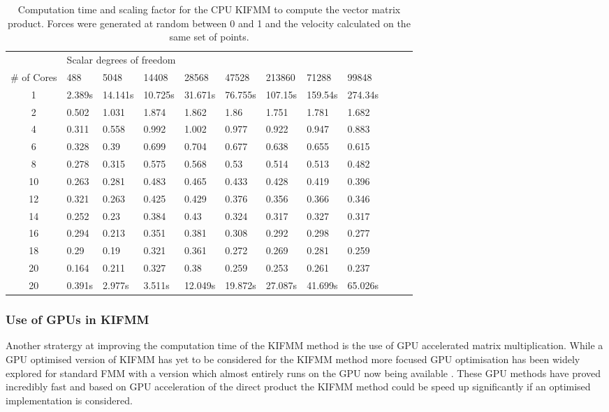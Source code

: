 \begin{table}[ht]
    \centering
    \setlength{\tabcolsep}{6pt}
    \renewcommand{\arraystretch}{1.4}
    \caption[Computation time and scaling factor for the CPU KIFMM to compute the vector matrix product.]{Computation time and scaling factor for the CPU KIFMM to compute the vector matrix product. Forces were generated at random between 0 and 1 and the velocity calculated on the same set of points.}
    \small
    \begin{tabular}{c|lllllllllll}
     & \multicolumn{8}{l}{Scalar degrees of freedom} \\ \cline{2-9}
    \# of Cores & 488 & 5048 & 14408 & 28568 & 47528 & 213860 & 71288 & 99848 \\ \hline
    1 & 2.389s & 14.141s & 10.725s & 31.671s & 76.755s & 107.15s & 159.54s & 274.34s \\ \hline
    2 & 0.502 & 1.031 & 1.874 & 1.862 & 1.86 & 1.751 & 1.781 & 1.682 \\
    4 & 0.311 & 0.558 & 0.992 & 1.002 & 0.977 & 0.922 & 0.947 & 0.883 \\
    6 & 0.328 & 0.39 & 0.699 & 0.704 & 0.677 & 0.638 & 0.655 & 0.615 \\
    8 & 0.278 & 0.315 & 0.575 & 0.568 & 0.53 & 0.514 & 0.513 & 0.482 \\
    10 & 0.263 & 0.281 & 0.483 & 0.465 & 0.433 & 0.428 & 0.419 & 0.396 \\
    12 & 0.321 & 0.263 & 0.425 & 0.429 & 0.376 & 0.356 & 0.366 & 0.346 \\
    14 & 0.252 & 0.23 & 0.384 & 0.43 & 0.324 & 0.317 & 0.327 & 0.317 \\
    16 & 0.294 & 0.213 & 0.351 & 0.381 & 0.308 & 0.292 & 0.298 & 0.277 \\
    18 & 0.29 & 0.19 & 0.321 & 0.361 & 0.272 & 0.269 & 0.281 & 0.259 \\
    20 & 0.164 & 0.211 & 0.327 & 0.38 & 0.259 & 0.253 & 0.261 & 0.237 \\ \hline
    20 & 0.391s & 2.977s & 3.511s & 12.049s & 19.872s & 27.087s & 41.699s & 65.026s \\
    \end{tabular}
    \label{tab:CPUparalisation}
\end{table}

\subsubsection{Use of GPUs in KIFMM}
Another stratergy at improving the computation time of the KIFMM method is the use of GPU accelerated matrix multiplication. While a GPU optimised version of KIFMM has yet to be considered for the KIFMM method more focused GPU optimisation has been widely explored for standard FMM with a version which almost entirely runs on the GPU now being available \cite{Yokota,Hamada200942Turbulence,Wilson2021ATraversal,Kohnke2020AAccuracy}. These GPU methods have proved incredibly fast and based on GPU acceleration of the direct product \cite{Gallagher2020} the KIFMM method could be speed up significantly if an optimised implementation is considered.

